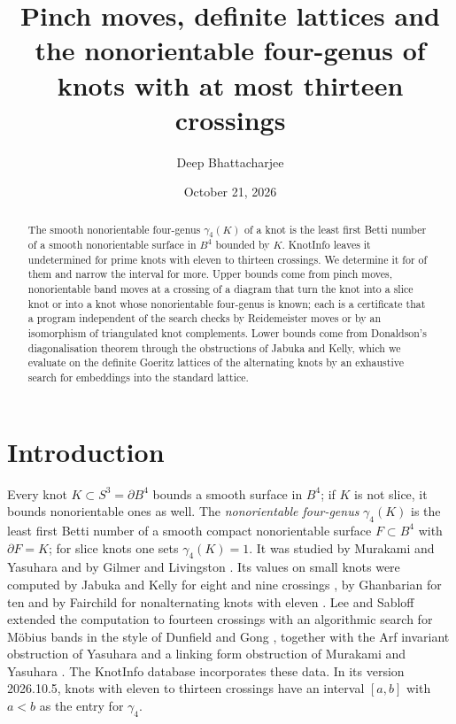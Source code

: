 \documentclass[11pt]{amsart}
\title[Pinch moves, definite lattices and the nonorientable four-genus]{Pinch moves, definite lattices and the nonorientable four-genus of knots with at most thirteen crossings}
\author{Deep Bhattacharjee}
\date{October 21, 2026}
\theoremstyle{definition}
\theoremstyle{remark}
\begin{document}
\begin{abstract}
The smooth nonorientable four-genus $\gamma_4(K)$ of a knot is the least first Betti number
of a smooth nonorientable surface in $B^4$ bounded by $K$. KnotInfo leaves it undetermined
for \ntotal{} prime knots with eleven to thirteen crossings. We determine it for
\nsettled{} of them and narrow the interval for \nnarrowed{} more. Upper bounds come from
pinch moves, nonorientable band moves at a crossing of a diagram that turn the knot into a
slice knot or into a knot whose nonorientable four-genus is known; each is a certificate
that a program independent of the search checks by Reidemeister moves or by an isomorphism
of triangulated knot complements. Lower bounds come from Donaldson's diagonalisation
theorem through the obstructions of Jabuka and Kelly, which we evaluate on the definite
Goeritz lattices of the alternating knots by an exhaustive search for embeddings into the
standard lattice.
\end{abstract}
\maketitle

\section{Introduction}

Every knot $K\subset S^3=\partial B^4$ bounds a smooth surface in $B^4$; if $K$ is not
slice, it bounds nonorientable ones as well. The \emph{nonorientable four-genus} $\gamma_4(K)$ is the least
first Betti number of a smooth compact nonorientable surface $F\subset B^4$ with
$\partial F=K$; for slice knots one sets $\gamma_4(K)=1$. It was studied by Murakami and
Yasuhara \cite{MY} and by Gilmer and Livingston \cite{GiL}. Its values on small knots were computed by Jabuka and
Kelly for eight and nine crossings \cite{JK}, by Ghanbarian for ten \cite{Gh} and by Fairchild
for nonalternating knots with eleven \cite{Fa}. Lee and Sabloff \cite{LS} extended the
computation to fourteen crossings with an algorithmic search for M\"obius bands in the
style of Dunfield and Gong \cite{DG}, together with the Arf invariant obstruction of
Yasuhara \cite{Ya} and a linking form obstruction of Murakami and Yasuhara \cite{MY}. The KnotInfo database \cite{KnotInfo}
incorporates these data. In its version 2026.10.5, \ntotal{} knots with eleven to thirteen
crossings have an interval $[a,b]$ with $a<b$ as the entry for $\gamma_4$.
\end{document}
